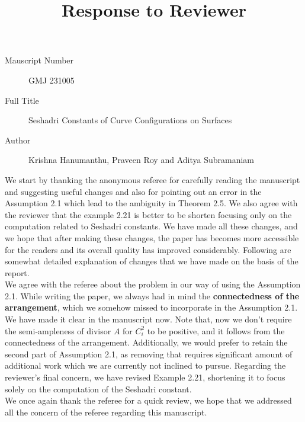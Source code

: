 \documentclass[12pt,twoside,reqno]{amsart}
\numberwithin{equation}{section}
\theoremstyle{definition}
\begin{document}
\title{Response to Reviewer}
\begin{description}
\item [Mauscript Number] GMJ 231005 \\
\item [Full Title] Seshadri Constants of Curve Configurations on Surfaces
\item [Author] Krishna Hanumanthu, Praveen Roy and Aditya Subramaniam
\end{description}

We start by thanking the anonymous referee for carefully reading the manuscript and suggesting 
useful changes and also for pointing out an error in the Assumption 2.1 which lead to the ambiguity in Theorem 2.5. We also agree with the reviewer that the example 2.21 is 
better to be shorten focusing only on the computation related to Seshadri constants. We have made all these changes, and we hope that after making these changes, the paper has becomes more accessible for the readers and its overall quality has improved considerably.  Following are somewhat detailed explanation of changes that we have made on the basis of the report. \\

We agree with the referee about the problem in our way of using the Assumption 2.1. While writing the paper, we always had in mind the \textbf{connectedness of the arrangement}, 
which we somehow missed to incorporate in the Assumption 2.1. We have made it clear in the manuscript now. Note that, now we don't require the semi-ampleness of divisor $A$ for $C_i^2$ to be positive, and it follows 
from the connectedness of the arrangement. Additionally, we would prefer to retain the second part of Assumption 2.1, as removing that requires significant amount of additional work which we are currently not inclined to pursue.
 Regarding the reviewer's final concern, we have revised Example 2.21, shortening it to focus solely on the computation of the Seshadri constant. \\

We once again thank the referee for a quick review, we hope that we addressed all the concern of the referee regarding this manuscript.
\end{document}
